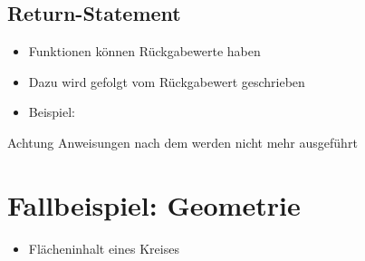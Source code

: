 \subsection{Return-Statement}
\begin{frame}
	\slidehead
	\begin{itemize}
		\item Funktionen können Rückgabewerte haben
		\item Dazu wird  gefolgt vom Rückgabewert geschrieben
		\item Beispiel: 
	\end{itemize}
\end{frame}

\begin{frame}
	\slidehead

	\begin{block}{Achtung}
		Anweisungen nach dem  werden nicht mehr ausgeführt
	\end{block}
\end{frame}

\livecoding


\subtitle{Kapitel 6: wie Funktionen funktionieren}


\section{Fallbeispiel: Geometrie}
\begin{frame}
	\slidehead

	\begin{figure}
		\centering
	\end{figure}
	\vspace{-10mm}
	\begin{itemize}
		\item Flächeninhalt eines Kreises
	\end{itemize}
\end{frame}

